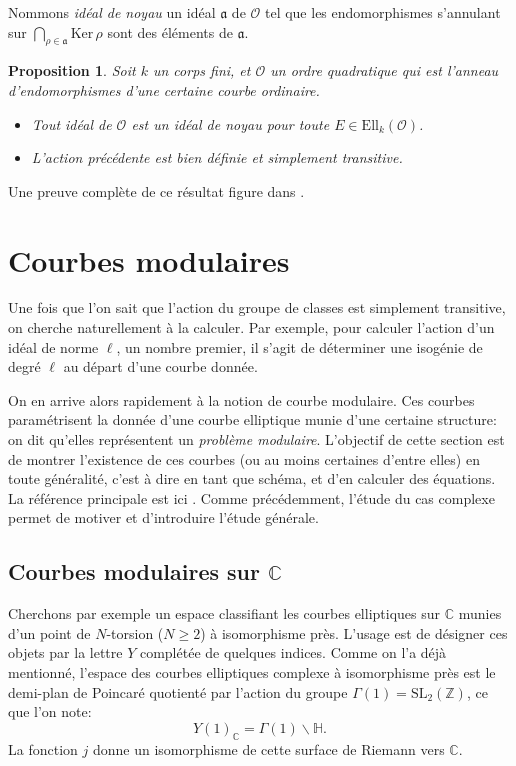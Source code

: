 \documentclass[11pt,a4paper]{article}
\newcommand{\Z}{\mathbb{Z}}
\newcommand{\C}{\mathbb{C}}
\renewcommand{\H}{\mathbb{H}}
\renewcommand{\O}{\mathcal{O}}
\renewcommand{\b}{\backslash}
\newcommand{\Ell}{\mathrm{Ell}}
\newcommand{\Ker}{\mathrm{Ker}\,}
\renewcommand{\frak}{\mathfrak}
\newtheorem*{prop}{Proposition}
\theoremstyle{definition}
\begin{document}
Nommons \emph{idéal de noyau} un idéal $\frak a$ de $\O$ tel que les endomorphismes s'annulant sur $\bigcap_{\rho\in \frak a} \Ker\rho$ sont des éléments de $\frak a$.

\begin{prop}
Soit $k$ un corps fini, et $\O$ un ordre quadratique qui est l'anneau d'endomorphismes d'une certaine courbe ordinaire.
\begin{itemize}
\item Tout idéal de $\O$ est un idéal de noyau pour toute $E\in \Ell_k(\O)$.
\item L'action précédente est bien définie et simplement transitive.
\end{itemize}
\end{prop}
Une preuve complète de ce résultat figure dans \cite{Waterhouse}.





\newpage

\section{Courbes modulaires}

Une fois que l'on sait que l'action du groupe de classes est simplement transitive, on cherche naturellement à la calculer. Par exemple, pour calculer l'action d'un idéal de norme $\ell$, un nombre premier, il s'agit de déterminer une isogénie de degré $\ell$ au départ d'une courbe donnée.

On en arrive alors rapidement à la notion de courbe modulaire. Ces courbes paramétrisent la donnée d'une courbe elliptique munie d'une certaine structure: on dit qu'elles représentent un \emph{problème modulaire}. L'objectif de cette section est de montrer l'existence de ces courbes (ou au moins certaines d'entre elles) en toute généralité, c'est à dire en tant que schéma, et d'en calculer des équations. La référence principale est ici \cite{KaMa}. Comme précédemment, l'étude du cas complexe permet de motiver et d'introduire l'étude générale.


\subsection{Courbes modulaires sur $\C$}

Cherchons par exemple un espace classifiant les courbes elliptiques sur $\C$ munies d'un point de $N$-torsion ($N\geq 2$) à isomorphisme près. L'usage est de désigner ces objets par la lettre $Y$ complétée de quelques indices. Comme on l'a déjà mentionné, l'espace des courbes elliptiques complexe à isomorphisme près est le demi-plan de Poincaré quotienté par l'action du groupe $\Gamma(1) = \mathrm{SL}_2(\Z)$, ce que l'on note:
$$Y(1)_\C = \Gamma(1) \b \H.$$
La fonction $j$ donne un isomorphisme de cette surface de Riemann vers $\C$.
\end{document}
